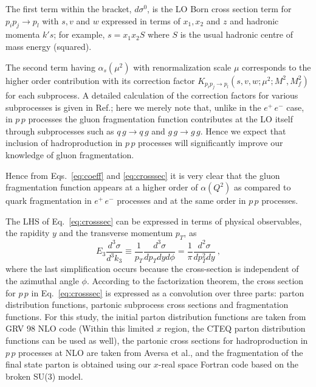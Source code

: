 \documentclass{ws-ijmpa}
\def\ra{{\rightarrow}}
\def\al{{\alpha}}
\begin{document}
The first term within the bracket, $d\sigma^0$, is the LO Born cross
section term for $p_i p_j \ra p_l$ with $s, v$ and $w$ expressed in terms
of $x_1, x_2$ and $z$ and hadronic momenta $k's$; for example, $s = x_1
x_2 S$ where $S$ is the usual hadronic centre of mass energy (squared).

The second term having $\alpha_s(\mu^2)$ with renormalization scale
$\mu$ corresponds to the higher order contribution with its correction
factor $K_{p_i p_j \ra p_l}(s,v,w;\mu^2;M^2,M^2_f)$ for each subprocess.
A detailed calculation of the correction factors for various subprocesses
is given in Ref.\cite{Aversa}; here we merely note that, unlike in the
$e^+\,e^-$ case, in $p\,p$ processes the gluon fragmentation function
contributes at the LO itself through subprocesses such as $q \, g \to q \,
g$ and $g \, g \to g \, g$. Hence we expect that inclusion of
hadroproduction in $p\,p$ processes will significantly improve our
knowledge of gluon fragmentation.

Hence from Eqs.~\ref{eq:coeff} and \ref{eq:crosssec} it is very
clear that the gluon fragmentation function appears at a higher order of
$\al(Q^2)$ as compared to quark fragmentation  in $e^+\,e^-$ processes
and at the same order in $p\,p$ processes.

The LHS of Eq.~\ref{eq:crosssec} can be expressed in terms of physical
observables, the rapidity $y$ and the transverse momentum $p_T$, as
\begin{equation}
E_3 \frac{d^3\sigma}{d^3k_3}  \equiv 
\frac{1}{p_T} \frac{d^3\sigma}{dp_T dy d\phi} = \frac{1}{\pi}
\frac{d^2\sigma}{dp_T^2 dy}~,
\label{eq:physobs}
\end{equation}
where the last simplification occurs because the cross-section is
independent of the azimuthal angle $\phi$.  According to the factorization
theorem, the cross section for $p\,p$ in Eq.~\ref{eq:crosssec} is
expressed as a convolution over three parts: parton distribution
functions, partonic subprocess cross sections and fragmentation
functions. For this study, the initial parton distribution functions
are taken from GRV 98 NLO code\cite{GRV98} (Within this limited $x$
region, the CTEQ parton distribution functions can be used as well),
the partonic cross sections for hadroproduction in $p\,p$ processes at
NLO are taken from Aversa et al.\cite{Aversacode}, and the fragmentation
of the final state parton is obtained using our $x$-real space Fortran
code based on the broken SU(3) model.

\end{document}
